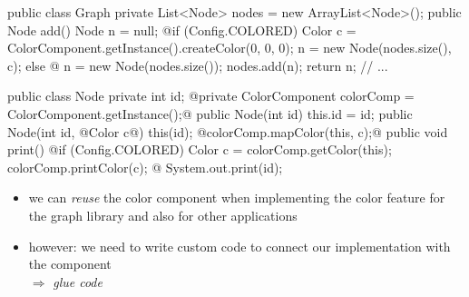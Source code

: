 \begin{frame}[fragile]{\myframetitle}
	\begin{mycolumns}[b,widths={60},animation=none]
\begin{codetight}{}
public class Graph {
	private List<Node> nodes = new ArrayList<Node>();
	public Node add() {
		Node n = null;
		@if (Config.COLORED) {
			Color c = ColorComponent.getInstance().createColor(0, 0, 0);
			n = new Node(nodes.size(), c);
		} else @ {
			n = new Node(nodes.size());
		}
		nodes.add(n);
		return n;
	}
	// ...
}
\end{codetight}
		\mynextcolumn
		\vspace{-10mm}
\begin{codetight}{}
public class Node {
	private int id;
	@private ColorComponent colorComp =
		ColorComponent.getInstance();@
	public Node(int id) { this.id = id; }
	public Node(int id, @Color c@) {
		this(id);
		@colorComp.mapColor(this, c);@
	}
	public void print() {
		@if (Config.COLORED) {
			Color c = colorComp.getColor(this);
			colorComp.printColor(c);
		}@
		System.out.print(id);
	}
}
\end{codetight}
	\end{mycolumns}
	\begin{note}{}
		\begin{itemize}
			\item we can \emph{reuse} the color component when implementing the color feature for the graph library and also for other applications
			\item however: we need to write custom code to connect our implementation with the component\\
				$\Rightarrow$ \emph{glue code}
		\end{itemize}
	\end{note}
\end{frame}

